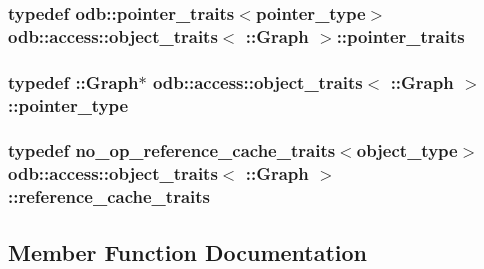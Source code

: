 \subsubsection[{pointer\+\_\+traits}]{\setlength{\rightskip}{0pt plus 5cm}typedef odb\+::pointer\+\_\+traits$<${\bf pointer\+\_\+type}$>$ odb\+::access\+::object\+\_\+traits$<$ \+::{\bf Graph} $>$\+::{\bf pointer\+\_\+traits}}\label{classodb_1_1access_1_1object__traits_3_01_1_1_graph_01_4_a52b969df9ca8e679089f25bf3e4ba93d}
\hypertarget{classodb_1_1access_1_1object__traits_3_01_1_1_graph_01_4_a125458878bb21ff928cedf5be575500b}{}
\subsubsection[{pointer\+\_\+type}]{\setlength{\rightskip}{0pt plus 5cm}typedef \+::{\bf Graph}$\ast$ odb\+::access\+::object\+\_\+traits$<$ \+::{\bf Graph} $>$\+::{\bf pointer\+\_\+type}}\label{classodb_1_1access_1_1object__traits_3_01_1_1_graph_01_4_a125458878bb21ff928cedf5be575500b}
\hypertarget{classodb_1_1access_1_1object__traits_3_01_1_1_graph_01_4_aeae80795564282b80ec224617147bf7a}{}
\subsubsection[{reference\+\_\+cache\+\_\+traits}]{\setlength{\rightskip}{0pt plus 5cm}typedef no\+\_\+op\+\_\+reference\+\_\+cache\+\_\+traits$<${\bf object\+\_\+type}$>$ odb\+::access\+::object\+\_\+traits$<$ \+::{\bf Graph} $>$\+::{\bf reference\+\_\+cache\+\_\+traits}}\label{classodb_1_1access_1_1object__traits_3_01_1_1_graph_01_4_aeae80795564282b80ec224617147bf7a}


\subsection{Member Function Documentation}
\hypertarget{classodb_1_1access_1_1object__traits_3_01_1_1_graph_01_4_ace7b33a0ca5385fe8e973b05e364fd05}{}
